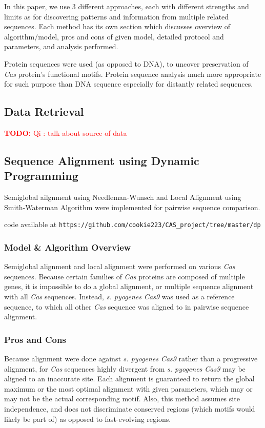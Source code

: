 \documentclass[11pt, oneside]{article}
\newcommand{\TODO}[1]{\textcolor{red}{\textbf{TODO: } #1}}
\begin{document}
In this paper, we use 3 different approaches, each with different strengths and limits as for discovering patterns and information from multiple related sequences. Each method has its own section which discusses overview of algorithm/model, pros and cons of given model, detailed protocol and parameters, and analysis performed. 

Protein sequences were used (as opposed to DNA), to uncover preservation of \textit{Cas} protein's functional motifs. Protein sequence analysis much more appropriate for such purpose than DNA sequence especially for distantly related sequences. 

\subsection{Data Retrieval}

\TODO{Qi : talk about source of data}

\subsection{Sequence Alignment using Dynamic Programming} \label{dpProtocol}

Semiglobal ailgnment using Needleman-Wunsch\cite{needlemanwunsch} and Local Alignment using Smith-Waterman Algorithm\cite{smithwaterman} were implemented for pairwise sequence comparison.

code available at \texttt{https://github.com/cookie223/CAS\_project/tree/master/dp}


\subsubsection{Model \& Algorithm Overview}

Semiglobal alignment and local alignment were performed on various \textit{Cas} sequences. Because certain families of \textit{Cas} proteins are composed of multiple genes, it is impossible to do a global alignment, or multiple sequence alignment with all \textit{Cas} sequences. Instead, \textit{s. pyogenes Cas9} was used as a reference sequence, to which all other \textit{Cas} sequence was aligned to in pairwise sequence alignment. 


\subsubsection{Pros and Cons}

Because alignment were done against \textit{s. pyogenes Cas9} rather than a progressive alignment, for \textit{Cas} sequences highly divergent from \textit{s. pyogenes Cas9} may be aligned to an inaccurate site. Each alignment is guaranteed to return the global maximum or the most optimal alignment with given parameters, which may or may not be the actual corresponding motif. Also, this method assumes site independence, and does not discriminate conserved regions (which motifs would likely be part of) as opposed to fast-evolving regions.
\end{document}

